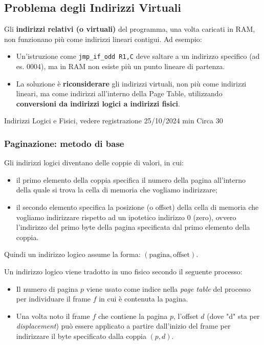 \subsection*{Problema degli Indirizzi Virtuali}
Gli \textbf{indirizzi relativi (o virtuali)} del programma, una volta caricati in RAM, non funzionano più come indirizzi lineari contigui. Ad esempio:
\begin{itemize}
    \item Un'istruzione come \texttt{jmp\_if\_odd R1,C} deve saltare a un indirizzo specifico (ad es. 0004), ma in RAM non esiste più un punto lineare di partenza.
    \item La soluzione è \textbf{riconsiderare} gli indirizzi virtuali, non più come indirizzi lineari, ma come indirizzi all'interno della Page Table, utilizzando \textbf{conversioni da indirizzi logici a indirizzi fisici}.
\end{itemize}


Indirizzi Logici e Fisici, vedere registrazione 25/10/2024 min Circa 30

\subsubsection{Paginazione: metodo di base}
Gli indirizzi logici diventano delle coppie di valori, in cui:
\begin{itemize}
    \item il primo elemento della coppia specifica il numero della pagina all’interno della quale si trova la cella di memoria che vogliamo indirizzare;
    \item il secondo elemento specifica la posizione (o offset) della cella di memoria che vogliamo indirizzare rispetto ad un ipotetico indirizzo 0 (zero), ovvero l’indirizzo del primo byte della pagina specificata dal primo elemento della coppia.
\end{itemize}
Quindi un indirizzo logico assume la forma: $(\text{pagina}, \text{offset})$.


Un indirizzo logico viene tradotto in uno fisico secondo il seguente processo:
\begin{itemize}
    \item Il numero di pagina $p$ viene usato come indice nella \textit{page table} del processo per individuare il frame $f$ in cui è contenuta la pagina.
    \item Una volta noto il frame $f$ che contiene la pagina $p$, l’offset $d$ (dove "d" sta per \textit{displacement}) può essere applicato a partire dall’inizio del frame per indirizzare il byte specificato dalla coppia $(p, d)$.
\end{itemize}

